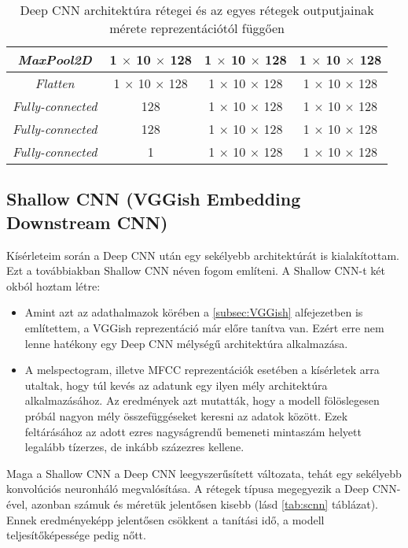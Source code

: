 \begin{table}[H]
\begin{tabular}{ | c | c |  c | c |}
		\hline
		\emph{MaxPool2D} & 1 $\times$ 10 $\times$ 128 & 1 $\times$ 10 $\times$ 128 & 1 $\times$ 10 $\times$ 128 \\
		\hline
		\emph{Flatten} & 1 $\times$ 10 $\times$ 128 & 1 $\times$ 10 $\times$ 128 & 1 $\times$ 10 $\times$ 128 \\
		\hline
		\emph{Fully-connected} & 128 & 1 $\times$ 10 $\times$ 128 & 1 $\times$ 10 $\times$ 128 \\
		\hline
		\emph{Fully-connected} & 128 & 1 $\times$ 10 $\times$ 128 & 1 $\times$ 10 $\times$ 128 \\
		\hline
		\emph{Fully-connected} & 1 & 1 $\times$ 10 $\times$ 128 & 1 $\times$ 10 $\times$ 128 \\
		\hline
	\end{tabular}
	\caption{Deep CNN architektúra rétegei és az egyes rétegek outputjainak mérete reprezentációtól függően}
	\label{tab:dcnn}
\end{table}

\subsection{Shallow CNN (VGGish Embedding Downstream CNN)}

Kísérleteim során a Deep CNN után egy sekélyebb architektúrát is kialakítottam. Ezt a továbbiakban Shallow CNN néven fogom említeni. A Shallow CNN-t két okból hoztam létre:
 
\begin{itemize}
 \item Amint azt az adathalmazok körében a \ref{subsec:VGGish} alfejezetben is említettem, a VGGish reprezentáció már előre tanítva van. Ezért erre nem lenne hatékony egy Deep CNN mélységű architektúra alkalmazása.
 \item A melspectogram, illetve MFCC reprezentációk esetében a kísérletek arra utaltak, hogy túl kevés az adatunk egy ilyen mély architektúra alkalmazásához. Az eredmények azt mutatták, hogy a modell fölöslegesen próbál nagyon mély összefüggéseket keresni az adatok között. Ezek feltárásához az adott ezres nagyságrendű bemeneti mintaszám helyett legalább tízerzes, de inkább százezres kellene.
\end{itemize}

Maga a Shallow CNN a Deep CNN leegyszerűsített változata, tehát egy sekélyebb konvolúciós neuronháló megvalósítása. A rétegek típusa megegyezik a Deep CNN-ével, azonban számuk és méretük jelentősen kisebb (lásd \ref{tab:scnn} táblázat). Ennek eredményeképp jelentősen csökkent a tanítási idő, a modell teljesítőképessége pedig nőtt.


